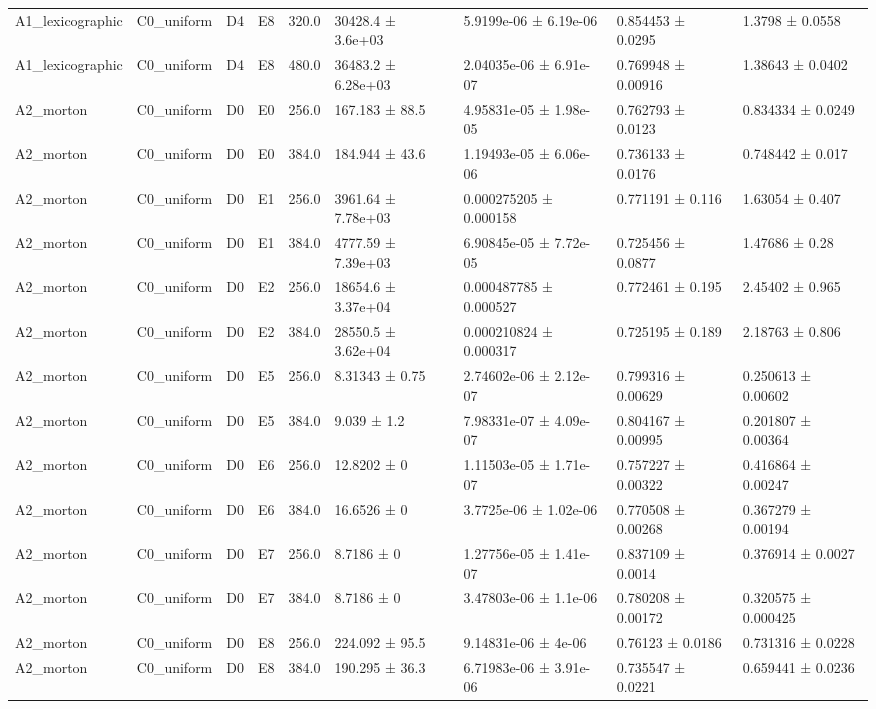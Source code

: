\begin{table}
\begin{tabular}{lllllllll}
A1\_lexicographic & C0\_uniform & D4 & E8 & 320.0 & 30428.4 ± 3.6e+03 & 5.9199e-06 ± 6.19e-06 & 0.854453 ± 0.0295 & 1.3798 ± 0.0558 \\
A1\_lexicographic & C0\_uniform & D4 & E8 & 480.0 & 36483.2 ± 6.28e+03 & 2.04035e-06 ± 6.91e-07 & 0.769948 ± 0.00916 & 1.38643 ± 0.0402 \\
A2\_morton & C0\_uniform & D0 & E0 & 256.0 & 167.183 ± 88.5 & 4.95831e-05 ± 1.98e-05 & 0.762793 ± 0.0123 & 0.834334 ± 0.0249 \\
A2\_morton & C0\_uniform & D0 & E0 & 384.0 & 184.944 ± 43.6 & 1.19493e-05 ± 6.06e-06 & 0.736133 ± 0.0176 & 0.748442 ± 0.017 \\
A2\_morton & C0\_uniform & D0 & E1 & 256.0 & 3961.64 ± 7.78e+03 & 0.000275205 ± 0.000158 & 0.771191 ± 0.116 & 1.63054 ± 0.407 \\
A2\_morton & C0\_uniform & D0 & E1 & 384.0 & 4777.59 ± 7.39e+03 & 6.90845e-05 ± 7.72e-05 & 0.725456 ± 0.0877 & 1.47686 ± 0.28 \\
A2\_morton & C0\_uniform & D0 & E2 & 256.0 & 18654.6 ± 3.37e+04 & 0.000487785 ± 0.000527 & 0.772461 ± 0.195 & 2.45402 ± 0.965 \\
A2\_morton & C0\_uniform & D0 & E2 & 384.0 & 28550.5 ± 3.62e+04 & 0.000210824 ± 0.000317 & 0.725195 ± 0.189 & 2.18763 ± 0.806 \\
A2\_morton & C0\_uniform & D0 & E5 & 256.0 & 8.31343 ± 0.75 & 2.74602e-06 ± 2.12e-07 & 0.799316 ± 0.00629 & 0.250613 ± 0.00602 \\
A2\_morton & C0\_uniform & D0 & E5 & 384.0 & 9.039 ± 1.2 & 7.98331e-07 ± 4.09e-07 & 0.804167 ± 0.00995 & 0.201807 ± 0.00364 \\
A2\_morton & C0\_uniform & D0 & E6 & 256.0 & 12.8202 ± 0 & 1.11503e-05 ± 1.71e-07 & 0.757227 ± 0.00322 & 0.416864 ± 0.00247 \\
A2\_morton & C0\_uniform & D0 & E6 & 384.0 & 16.6526 ± 0 & 3.7725e-06 ± 1.02e-06 & 0.770508 ± 0.00268 & 0.367279 ± 0.00194 \\
A2\_morton & C0\_uniform & D0 & E7 & 256.0 & 8.7186 ± 0 & 1.27756e-05 ± 1.41e-07 & 0.837109 ± 0.0014 & 0.376914 ± 0.0027 \\
A2\_morton & C0\_uniform & D0 & E7 & 384.0 & 8.7186 ± 0 & 3.47803e-06 ± 1.1e-06 & 0.780208 ± 0.00172 & 0.320575 ± 0.000425 \\
A2\_morton & C0\_uniform & D0 & E8 & 256.0 & 224.092 ± 95.5 & 9.14831e-06 ± 4e-06 & 0.76123 ± 0.0186 & 0.731316 ± 0.0228 \\
A2\_morton & C0\_uniform & D0 & E8 & 384.0 & 190.295 ± 36.3 & 6.71983e-06 ± 3.91e-06 & 0.735547 ± 0.0221 & 0.659441 ± 0.0236 \\

\end{tabular}
\end{table}
